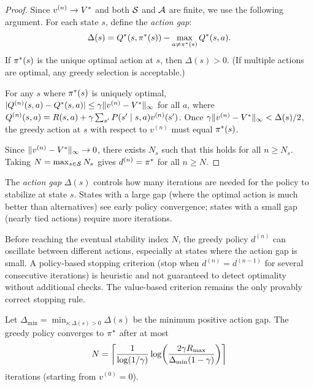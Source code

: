 \documentclass[11pt,a4paper]{article}
\begin{document}
\begin{proof}
Since $v^{(n)} \to V^*$ and both $\mathcal{S}$ and $\mathcal{A}$ are
finite, we use the following argument. For each state $s$, define
the \emph{action gap}:
\[
    \Delta(s) = Q^*(s, \pi^*(s)) -
    \max_{a \neq \pi^*(s)} Q^*(s, a).
\]
If $\pi^*(s)$ is the unique optimal action at $s$, then
$\Delta(s) > 0$. (If multiple actions are optimal, any greedy
selection is acceptable.)

For any $s$ where $\pi^*(s)$ is uniquely optimal,
$|Q^{(n)}(s,a) - Q^*(s,a)| \leq \gamma
\|v^{(n)} - V^*\|_\infty$ for all $a$, where
$Q^{(n)}(s,a) = R(s,a) + \gamma \sum_{s'} P(s' \mid s,a)
v^{(n)}(s')$. Once $\gamma \|v^{(n)} - V^*\|_\infty <
\Delta(s)/2$, the greedy action at $s$ with respect to $v^{(n)}$
must equal $\pi^*(s)$.

Since $\|v^{(n)} - V^*\|_\infty \to 0$, there exists $N_s$ such
that this holds for all $n \geq N_s$. Taking
$N = \max_{s \in \mathcal{S}} N_s$ gives $d^{(n)} = \pi^*$ for
all $n \geq N$.
\end{proof}

\begin{remark}
\label{rem:action-gap}
The \emph{action gap} $\Delta(s)$ controls how many iterations are
needed for the policy to stabilize at state $s$. States with a
large gap (where the optimal action is much better than alternatives)
see early policy convergence; states with a small gap (nearly
tied actions) require more iterations.
\end{remark}

\begin{warning}[title={Policy May Oscillate Before Convergence}]
Before reaching the eventual stability index $N$, the greedy policy
$d^{(n)}$ can oscillate between different actions, especially at
states where the action gap is small. A policy-based stopping
criterion (stop when $d^{(n)} = d^{(n-1)}$ for several consecutive
iterations) is heuristic and not guaranteed to detect optimality
without additional checks. The value-based criterion remains the
only provably correct stopping rule.
\end{warning}

\begin{proposition}
\label{prop:policy-rate}
Let $\Delta_{\min} = \min_{s : \Delta(s) > 0} \Delta(s)$ be the
minimum positive action gap. The greedy policy converges to
$\pi^*$ after at most
\[
    N = \left\lceil
    \frac{1}{\log(1/\gamma)}
    \log\!\left(\frac{2\gamma R_{\max}}
    {\Delta_{\min}(1-\gamma)}\right)
    \right\rceil
\]
iterations (starting from $v^{(0)} = 0$).
\end{proposition}
\end{document}
